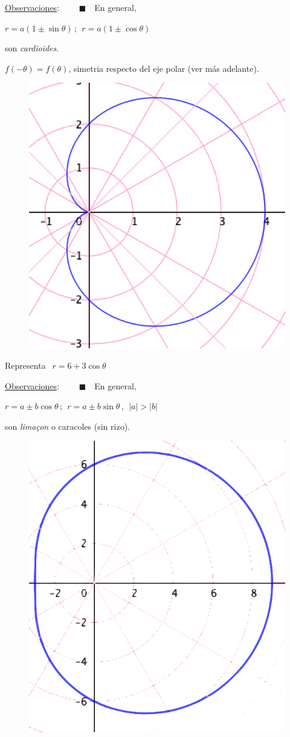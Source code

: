 \begin{multicols}{2}

\underline{Observaciones}: 
\tiny{$\qquad \blacksquare \quad $}\normalsize{En} general, 


\hspace{10mm}$r=a(1\pm \sin \theta)\, ; \ \ r=a(1\pm \cos \theta)\ $ 

\hspace{10mm}son \emph{cardioides}.

\textcolor{gris}{$f(-\theta)=f(\theta)$}, simetria respecto del eje polar (ver más adelante).
\begin{figure}[H]
	\centering
	\includegraphics[width=.25\textwidth]{img-polares/polares26.png}
\end{figure}
\end{multicols}

\vspace{5mm}
\begin{mipropuesto}

Representa $\ \ r=6+3\cos \theta$
\end{mipropuesto}

\begin{multicols}{2}

\underline{Observaciones}: 
\tiny{$\qquad \blacksquare \quad $}\normalsize{En} general, 


\hspace{10mm}$r=a \pm b \cos \theta \, ; \ \ r=a \pm b \sin \theta\, , \ \ |a|>|b| $ 

\hspace{10mm}son \emph{limaçon} o caracoles (sin rizo).


\begin{figure}[H]
	\centering
	\includegraphics[width=.2\textwidth]{img-polares/polares48.png}
\end{figure}
\end{multicols}


